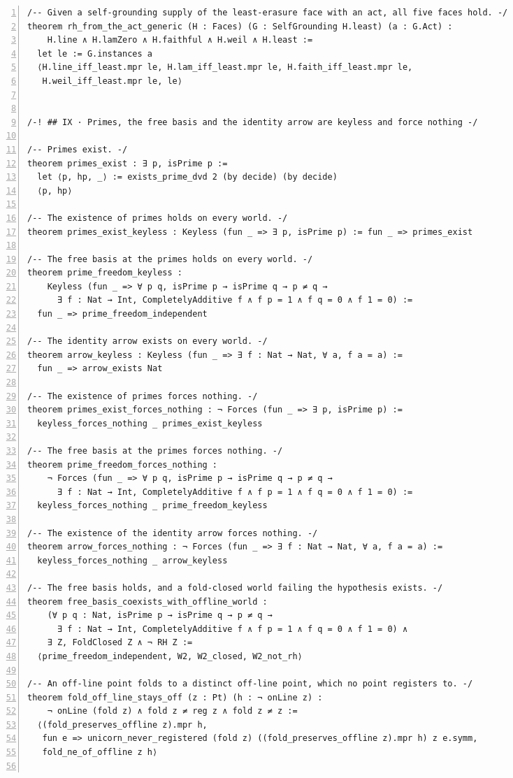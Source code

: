 \documentclass[10pt]{article}
\newcommand{\leansize}{\fontsize{5.5pt}{6.75pt}\selectfont}
\begin{document}
\begin{multicols}{2}
\begin{Verbatim}[numbers=left,firstnumber=1,numbersep=3pt,xleftmargin=2.6em,breaklines=true,breakanywhere=true,breakautoindent=false,breakindent=1.4em,breaksymbolleft={},breakanywheresymbolpre={},fontsize=\leansize]
/-- Given a self-grounding supply of the least-erasure face with an act, all five faces hold. -/
theorem rh_from_the_act_generic (H : Faces) (G : SelfGrounding H.least) (a : G.Act) :
    H.line ∧ H.lamZero ∧ H.faithful ∧ H.weil ∧ H.least :=
  let le := G.instances a
  ⟨H.line_iff_least.mpr le, H.lam_iff_least.mpr le, H.faith_iff_least.mpr le,
   H.weil_iff_least.mpr le, le⟩


/-! ## IX · Primes, the free basis and the identity arrow are keyless and force nothing -/

/-- Primes exist. -/
theorem primes_exist : ∃ p, isPrime p :=
  let ⟨p, hp, _⟩ := exists_prime_dvd 2 (by decide) (by decide)
  ⟨p, hp⟩

/-- The existence of primes holds on every world. -/
theorem primes_exist_keyless : Keyless (fun _ => ∃ p, isPrime p) := fun _ => primes_exist

/-- The free basis at the primes holds on every world. -/
theorem prime_freedom_keyless :
    Keyless (fun _ => ∀ p q, isPrime p → isPrime q → p ≠ q →
      ∃ f : Nat → Int, CompletelyAdditive f ∧ f p = 1 ∧ f q = 0 ∧ f 1 = 0) :=
  fun _ => prime_freedom_independent

/-- The identity arrow exists on every world. -/
theorem arrow_keyless : Keyless (fun _ => ∃ f : Nat → Nat, ∀ a, f a = a) :=
  fun _ => arrow_exists Nat

/-- The existence of primes forces nothing. -/
theorem primes_exist_forces_nothing : ¬ Forces (fun _ => ∃ p, isPrime p) :=
  keyless_forces_nothing _ primes_exist_keyless

/-- The free basis at the primes forces nothing. -/
theorem prime_freedom_forces_nothing :
    ¬ Forces (fun _ => ∀ p q, isPrime p → isPrime q → p ≠ q →
      ∃ f : Nat → Int, CompletelyAdditive f ∧ f p = 1 ∧ f q = 0 ∧ f 1 = 0) :=
  keyless_forces_nothing _ prime_freedom_keyless

/-- The existence of the identity arrow forces nothing. -/
theorem arrow_forces_nothing : ¬ Forces (fun _ => ∃ f : Nat → Nat, ∀ a, f a = a) :=
  keyless_forces_nothing _ arrow_keyless

/-- The free basis holds, and a fold-closed world failing the hypothesis exists. -/
theorem free_basis_coexists_with_offline_world :
    (∀ p q : Nat, isPrime p → isPrime q → p ≠ q →
      ∃ f : Nat → Int, CompletelyAdditive f ∧ f p = 1 ∧ f q = 0 ∧ f 1 = 0) ∧
    ∃ Z, FoldClosed Z ∧ ¬ RH Z :=
  ⟨prime_freedom_independent, W2, W2_closed, W2_not_rh⟩

/-- An off-line point folds to a distinct off-line point, which no point registers to. -/
theorem fold_off_line_stays_off (z : Pt) (h : ¬ onLine z) :
    ¬ onLine (fold z) ∧ fold z ≠ reg z ∧ fold z ≠ z :=
  ⟨(fold_preserves_offline z).mpr h,
   fun e => unicorn_never_registered (fold z) ((fold_preserves_offline z).mpr h) z e.symm,
   fold_ne_of_offline z h⟩


\end{Verbatim}
\end{multicols}
\end{document}
